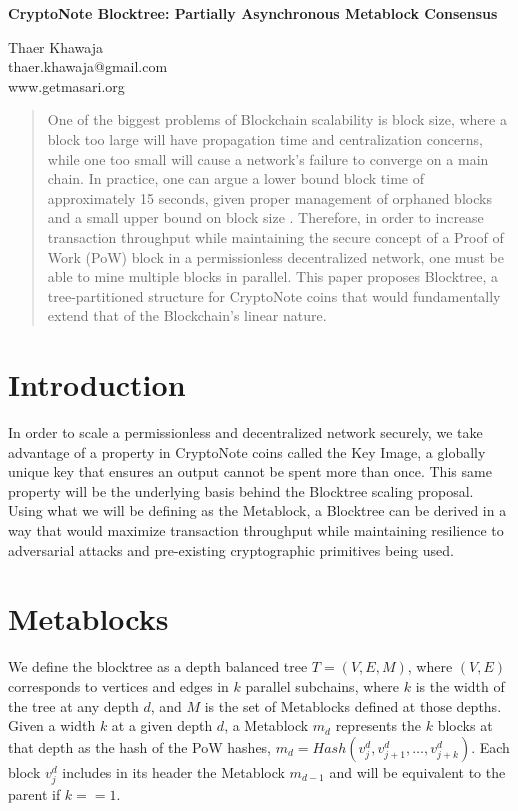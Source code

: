 \documentclass{article}
\begin{document}
\begin{center}
  \textbf{CryptoNote Blocktree: Partially Asynchronous Metablock Consensus}\\
  \vspace{5mm}

  {\small
    Thaer Khawaja\\
    thaer.khawaja@gmail.com\\
    www.getmasari.org\\
  }
  \vspace{5mm}
\end{center}

\begin{abstract}
One of the biggest problems of Blockchain scalability is block size, where a block too large will have propagation time and centralization concerns, while one too small will cause a network's failure to converge on a main chain. In practice, one can argue a lower bound block time of approximately 15 seconds, given proper management of orphaned blocks and a small upper bound on block size \cite{khawaja}. Therefore, in order to increase transaction throughput while maintaining the secure concept of a Proof of Work (PoW) block in a permissionless decentralized network, one must be able to mine multiple blocks in parallel. This paper proposes Blocktree, a tree-partitioned structure for CryptoNote coins that would fundamentally extend that of the Blockchain's linear nature.
\end{abstract}
\section{Introduction}
In order to scale a permissionless and decentralized network securely, we take advantage of a property in CryptoNote coins called the Key Image, a globally unique key that ensures an output cannot be spent more than once\cite{saberhagen}. This same property will be the underlying basis behind the Blocktree scaling proposal. Using what we will be defining as the Metablock, a Blocktree can be derived in a way that would maximize transaction throughput while maintaining resilience to adversarial attacks and pre-existing cryptographic primitives being used.
\section{Metablocks}
We define the blocktree as a depth balanced tree $T = (V, E, M)$, where $(V,E)$ corresponds to vertices and edges in $k$ parallel subchains, where $k$ is the width of the tree at any depth $d$, and $M$ is the set of Metablocks defined at those depths. Given a width $k$ at a given depth $d$, a Metablock $m_d$ represents the $k$ blocks at that depth as the hash of the PoW hashes, $m_d = Hash(v_j^d,v_{j + 1}^d,\ldots,v_{j+k}^d)$. Each block $v_{j}^{d}$ includes in its header the Metablock $m_{d-1}$ and will be equivalent to the parent if $k == 1$.
\end{document}
